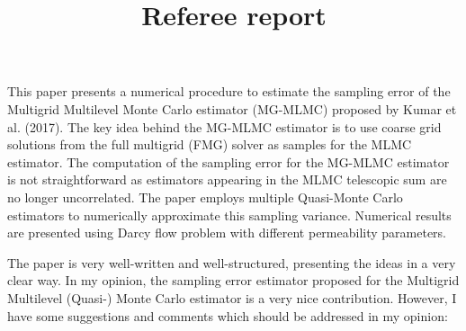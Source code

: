 \documentclass{article}
\title{Referee report}
\author{}
\begin{document}
\maketitle
This paper presents a numerical procedure to estimate the sampling error of the Multigrid Multilevel Monte Carlo estimator (MG-MLMC) proposed by Kumar et al. (2017). The key idea behind the MG-MLMC estimator is to use coarse grid solutions from the full multigrid (FMG) solver as samples for the MLMC estimator. The computation of the sampling error for the MG-MLMC estimator is not straightforward as estimators appearing in the MLMC telescopic sum are no longer uncorrelated. The paper employs multiple Quasi-Monte Carlo estimators to numerically approximate this sampling variance. Numerical results are presented using Darcy flow problem with different permeability parameters. 

The paper is very well-written and well-structured, presenting the ideas in a very clear way. In my opinion, the sampling error estimator proposed for the Multigrid Multilevel (Quasi-) Monte Carlo estimator is a very nice contribution. However, I have some suggestions and comments which should be addressed in my opinion:
\end{document}
